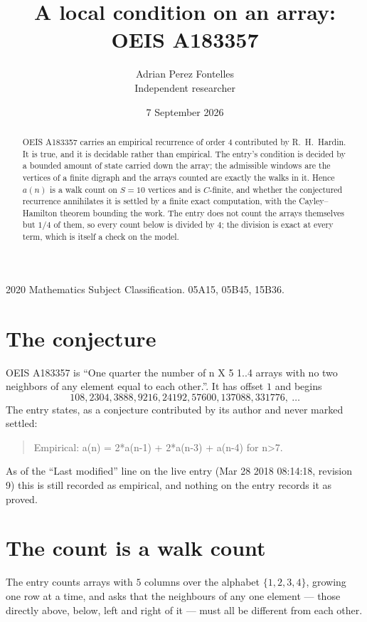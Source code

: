 \documentclass[11pt,a4paper]{article}
\title{A local condition on an array: OEIS A183357}
\author{Adrian Perez Fontelles\\ \small Independent researcher}
\date{7 September 2026}
\theoremstyle{plain}
\theoremstyle{definition}
\begin{document}
\maketitle

\begin{abstract}
OEIS A183357 carries an empirical recurrence of order $4$ contributed by R.~H.~Hardin. It is
true, and it is decidable rather than empirical. The entry's condition is decided by a bounded amount of state carried down the array; the
admissible windows are the vertices of a finite digraph and the arrays counted are exactly the
walks in it. Hence $a(n)$ is a walk count on $S=10$ vertices and is $C$-finite, and whether the
conjectured recurrence annihilates it is settled by a finite exact computation, with the
Cayley--Hamilton theorem bounding the work. The entry does not count the arrays themselves but $1/4$ of them, so every count below is divided by $4$; the division is exact at every term, which is itself a check on the model.
\end{abstract}

\noindent\small 2020 Mathematics Subject Classification. 05A15, 05B45, 15B36.\normalsize

\section{The conjecture}

OEIS A183357 is ``One quarter the number of n X 5 1..4 arrays with no two neighbors of any element equal to each other.''. It has offset $1$ and begins
\[
108, 2304, 3888, 9216, 24192, 57600, 137088, 331776,\ \dots
\]
The entry states, as a conjecture contributed by its author and never marked settled:
\begin{quote}
Empirical: a(n) = 2*a(n-1) + 2*a(n-3) + a(n-4) for n>7.
\end{quote}
As of the ``Last modified'' line on the live entry (Mar 28 2018 08:14:18, revision 9) this is still
recorded as empirical, and nothing on the entry records it as proved.

\section{The count is a walk count}

The entry counts arrays with $5$ columns over the alphabet $\{1,2,3,4\}$, growing one row at a time, and asks that the neighbours of any one element --- those directly above, below, left and right of it --- must all be different from each other.
\end{document}
